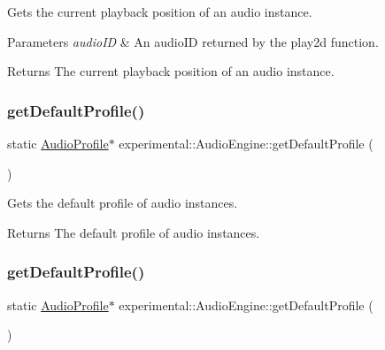 Gets the current playback position of an audio instance.


\begin{DoxyParams}{Parameters}
{\em audio\+ID} & An audio\+ID returned by the play2d function. \\
\hline
\end{DoxyParams}
\begin{DoxyReturn}{Returns}
The current playback position of an audio instance. 
\end{DoxyReturn}
\mbox{\label{classexperimental_1_1AudioEngine_a0579fbcef062480d4de9edf98857cf12}} 
\subsubsection{\texorpdfstring{get\+Default\+Profile()}{getDefaultProfile()}\hspace{0.1cm}{\footnotesize\ttfamily [1/2]}}
{\footnotesize\ttfamily static \hyperlink{classexperimental_1_1AudioProfile}{Audio\+Profile}$\ast$ experimental\+::\+Audio\+Engine\+::get\+Default\+Profile (\begin{DoxyParamCaption}{ }\end{DoxyParamCaption})\hspace{0.3cm}{\ttfamily [static]}}

Gets the default profile of audio instances.

\begin{DoxyReturn}{Returns}
The default profile of audio instances. 
\end{DoxyReturn}
\mbox{\label{classexperimental_1_1AudioEngine_a0579fbcef062480d4de9edf98857cf12}} 
\subsubsection{\texorpdfstring{get\+Default\+Profile()}{getDefaultProfile()}\hspace{0.1cm}{\footnotesize\ttfamily [2/2]}}
{\footnotesize\ttfamily static \hyperlink{classexperimental_1_1AudioProfile}{Audio\+Profile}$\ast$ experimental\+::\+Audio\+Engine\+::get\+Default\+Profile (\begin{DoxyParamCaption}{ }\end{DoxyParamCaption})\hspace{0.3cm}{\ttfamily [static]}}

